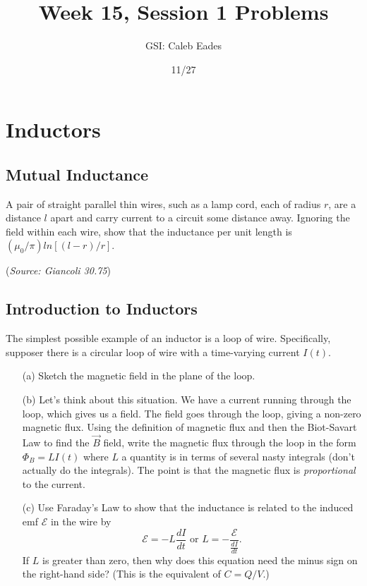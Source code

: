 \documentclass{article}
\begin{document}
\title{Week 15, Session 1 Problems}
\author{GSI: Caleb Eades}
\date{11/27}
\maketitle

\section{Inductors}

\subsection{Mutual Inductance}

A pair of straight parallel thin wires, such as a lamp cord, each of radius $r$, are a distance $l$ apart and carry current to a circuit some distance away. Ignoring the field within each wire, show that the inductance per unit length is $(\mu_0/\pi)ln[(l-r)/r]$.

(\textit{Source: Giancoli 30.75})

\subsection{Introduction to Inductors}

The simplest possible example of an inductor is a loop of wire. Specifically, supposer there is a circular loop of wire with a time-varying current $I(t)$.
\begin{itemize}
	\item[(a)] Sketch the magnetic field in the plane of the loop.
	\item[(b)] Let's think about this situation. We have a current running through the loop, which gives us a field. The field goes through the loop, giving a non-zero magnetic flux. Using the definition of magnetic flux and then the Biot-Savart Law to find the $\vec{B}$ field, write the magnetic flux through the loop in the form
	$\Phi_B = L I(t)$
	where $L$ a quantity is in terms of several nasty integrals (don't actually do the integrals). The point is that the magnetic flux is \textit{proportional} to the current.
	\item[(c)] Use Faraday's Law to show that the inductance is related to the induced emf $\mathcal{E}$ in the wire by
	\begin{equation}
	\mathcal{E} = - L \frac{dI}{dt} \text{ or }L = - \frac{\mathcal{E}}{\frac{dI}{dt}}.
	\label{eq:inductor}
	\end{equation}
	If $L$ is greater than zero, then why does this equation need the minus sign on the right-hand side? (This is the equivalent of $C = Q/V$.) 
\end{itemize}
\end{document}
